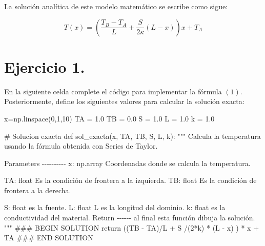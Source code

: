\documentclass[
  letterpaper,
  DIV=11,
  numbers=noendperiod]{scrreprt}
\newenvironment{Shaded}{\begin{snugshade}}{\end{snugshade}}
\newcommand{\CommentTok}[1]{\textcolor[rgb]{0.37,0.37,0.37}{#1}}
\newcommand{\ControlFlowTok}[1]{\textcolor[rgb]{0.00,0.23,0.31}{#1}}
\newcommand{\DecValTok}[1]{\textcolor[rgb]{0.68,0.00,0.00}{#1}}
\newcommand{\FloatTok}[1]{\textcolor[rgb]{0.68,0.00,0.00}{#1}}
\newcommand{\KeywordTok}[1]{\textcolor[rgb]{0.00,0.23,0.31}{#1}}
\newcommand{\NormalTok}[1]{\textcolor[rgb]{0.00,0.23,0.31}{#1}}
\newcommand{\OperatorTok}[1]{\textcolor[rgb]{0.37,0.37,0.37}{#1}}
\newcommand{\RegionMarkerTok}[1]{\textcolor[rgb]{0.00,0.23,0.31}{#1}}
\begin{document}
La solución analítica de este modelo matemático se escribe como sigue:

\[
T(x) =
\left(\frac{T_B - T_A}{L} + \frac{S}{2\kappa} \left(L - x\right) \right)x + T_A \tag{1}
\]

\section{Ejercicio 1.}\label{ejercicio-1.-3}

En la siguiente celda complete el código para implementar la fórmula
\((1)\). Posteriormente, define los siguientes valores para calcular la
solución exacta:

\begin{Shaded}
\begin{Highlighting}[]
\NormalTok{x}\OperatorTok{=}\NormalTok{np.linspace(}\DecValTok{0}\NormalTok{,}\DecValTok{1}\NormalTok{,}\DecValTok{10}\NormalTok{)}
\NormalTok{TA }\OperatorTok{=} \FloatTok{1.0}
\NormalTok{TB }\OperatorTok{=} \FloatTok{0.0}
\NormalTok{S }\OperatorTok{=} \FloatTok{1.0}
\NormalTok{L }\OperatorTok{=} \FloatTok{1.0}
\NormalTok{k }\OperatorTok{=} \FloatTok{1.0}
\end{Highlighting}
\end{Shaded}

\begin{Shaded}
\begin{Highlighting}[]
\CommentTok{\# Solucion exacta}
\KeywordTok{def}\NormalTok{ sol\_exacta(x, TA, TB, S, L, k):}
    \CommentTok{"""}
\CommentTok{    Calcula la temperatura usando la fórmula obtenida con Series de Taylor.}

\CommentTok{    Parameters}
\CommentTok{    {-}{-}{-}{-}{-}{-}{-}{-}{-}{-}}
\CommentTok{    x: np.array}
\CommentTok{    Coordenadas donde se calcula la temperatura.}

\CommentTok{    TA: float}
\CommentTok{    Es la condición de frontera a la izquierda.}
\CommentTok{    }
\CommentTok{    TB: float}
\CommentTok{    Es la condición de frontera a la derecha.}

\CommentTok{    S: float}
\CommentTok{    es la fuente.}
\CommentTok{    }
\CommentTok{    L: float}
\CommentTok{    L es la longitud del dominio.}
\CommentTok{    }
\CommentTok{    k: float}
\CommentTok{    es la conductividad del material.}
\CommentTok{    }
\CommentTok{    Return}
\CommentTok{    {-}{-}{-}{-}{-}{-}}
\CommentTok{    al final esta función dibuja la solución.}
\CommentTok{    """}
    \CommentTok{\#\#\# }\RegionMarkerTok{BEGIN}\CommentTok{ SOLUTION}
    \ControlFlowTok{return}\NormalTok{ ((TB }\OperatorTok{{-}}\NormalTok{ TA)}\OperatorTok{/}\NormalTok{L }\OperatorTok{+}\NormalTok{ S }\OperatorTok{/}\NormalTok{(}\DecValTok{2}\OperatorTok{*}\NormalTok{k) }\OperatorTok{*}\NormalTok{ (L }\OperatorTok{{-}}\NormalTok{ x) ) }\OperatorTok{*}\NormalTok{ x }\OperatorTok{+}\NormalTok{ TA}
    \CommentTok{\#\#\# }\RegionMarkerTok{END}\CommentTok{ SOLUTION}
\end{Highlighting}
\end{Shaded}
\end{document}
